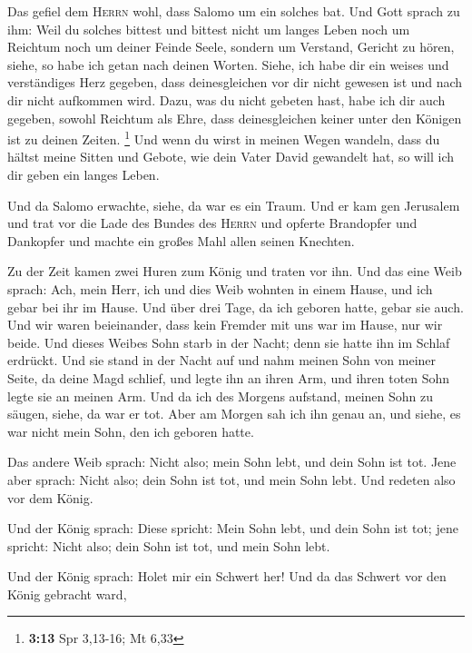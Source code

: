  Das gefiel dem \textsc{Herrn} wohl, dass Salomo um ein
solches bat.  Und Gott sprach zu ihm: Weil du solches
bittest und bittest nicht um langes Leben noch um Reichtum noch um
deiner Feinde Seele, sondern um Verstand, Gericht zu hören,
 siehe, so habe ich getan nach deinen Worten. Siehe, ich
habe dir ein weises und verständiges Herz gegeben, dass deinesgleichen
vor dir nicht gewesen ist und nach dir nicht aufkommen wird.
 Dazu, was du nicht gebeten hast, habe ich dir auch
gegeben, sowohl Reichtum als Ehre, dass deinesgleichen keiner unter den
Königen ist zu deinen Zeiten. \footnote{\textbf{3:13} Spr 3,13-16; Mt
  6,33}  Und wenn du wirst in meinen Wegen wandeln, dass
du hältst meine Sitten und Gebote, wie dein Vater David gewandelt hat,
so will ich dir geben ein langes Leben.

 Und da Salomo erwachte, siehe, da war es ein Traum. Und
er kam gen Jerusalem und trat vor die Lade des Bundes des \textsc{Herrn}
und opferte Brandopfer und Dankopfer und machte ein großes Mahl allen
seinen Knechten.

 Zu der Zeit kamen zwei Huren zum König und traten vor
ihn.  Und das eine Weib sprach: Ach, mein Herr, ich und
dies Weib wohnten in einem Hause, und ich gebar bei ihr im Hause.
 Und über drei Tage, da ich geboren hatte, gebar sie
auch. Und wir waren beieinander, dass kein Fremder mit uns war im Hause,
nur wir beide.  Und dieses Weibes Sohn starb in der
Nacht; denn sie hatte ihn im Schlaf erdrückt.  Und sie
stand in der Nacht auf und nahm meinen Sohn von meiner Seite, da deine
Magd schlief, und legte ihn an ihren Arm, und ihren toten Sohn legte sie
an meinen Arm.  Und da ich des Morgens aufstand, meinen
Sohn zu säugen, siehe, da war er tot. Aber am Morgen sah ich ihn genau
an, und siehe, es war nicht mein Sohn, den ich geboren hatte.

 Das andere Weib sprach: Nicht also; mein Sohn lebt, und
dein Sohn ist tot. Jene aber sprach: Nicht also; dein Sohn ist tot, und
mein Sohn lebt. Und redeten also vor dem König.

 Und der König sprach: Diese spricht: Mein Sohn lebt, und
dein Sohn ist tot; jene spricht: Nicht also; dein Sohn ist tot, und mein
Sohn lebt.

 Und der König sprach: Holet mir ein Schwert her! Und da
das Schwert vor den König gebracht ward,


